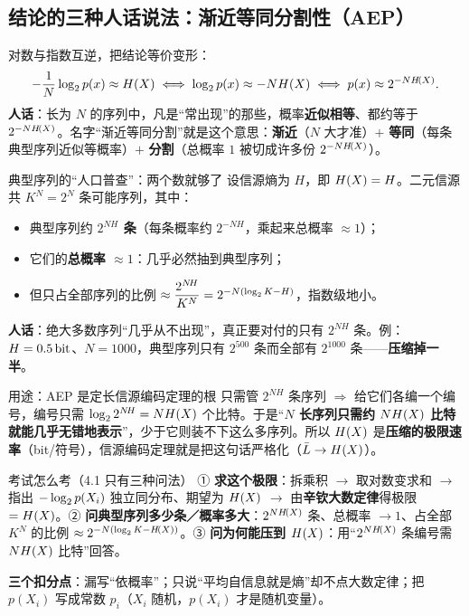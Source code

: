 \documentclass[11pt,a4paper]{ctexart}
\begin{document}
\subsection{结论的三种人话说法：渐近等同分割性（AEP）}

对数与指数互逆，把结论等价变形：
\begin{equation*}
-\frac1N\log_{2} p(x)\approx H\!\left(X\right)\iff \log_{2} p(x)\approx-NH\!\left(X\right)\iff p(x)\approx 2^{-NH\!\left(X\right)}.
\end{equation*}
\textbf{人话}：长为 $N$ 的序列中，凡是“常出现”的那些，概率\textbf{近似相等}、都约等于 $2^{-NH\!\left(X\right)}$。名字“渐近等同分割”就是这个意思：\textbf{渐近}（$N$ 大才准）$+$ \textbf{等同}（每条典型序列近似等概率）$+$ \textbf{分割}（总概率 $1$ 被切成许多份 $2^{-NH\!\left(X\right)}$）。

\begin{idea}{典型序列的“人口普查”：两个数就够了}
设信源熵为 $H$，即 $H\!\left(X\right)=H$。二元信源共 $K^N=2^N$ 条可能序列，其中：
\begin{itemize}[leftmargin=1.3em,itemsep=1pt,topsep=1pt]
  \item 典型序列约 \textbf{$2^{N\!H}$ 条}（每条概率约 $2^{-N\!H}$，乘起来总概率 $\approx1$）；
  \item 它们的\textbf{总概率 $\approx1$}：几乎必然抽到典型序列；
  \item 但只占全部序列的比例 $\approx \dfrac{2^{N\!H}}{K^N}=2^{-N(\log_{2} K-H)}$，指数级地小。
\end{itemize}
\textbf{人话}：绝大多数序列“几乎从不出现”，真正要对付的只有 $2^{N\!H}$ 条。例：$H=0.5\,\text{bit}$、$N=1000$，典型序列只有 $2^{500}$ 条而全部有 $2^{1000}$ 条——\textbf{压缩掉一半}。
\end{idea}

\begin{idea}{用途：AEP 是定长信源编码定理的根}
只需管 $2^{N\!H}$ 条序列 $\Rightarrow$ 给它们各编一个编号，编号只需 $\log_{2} 2^{N\!H}=NH\!\left(X\right)$ 个比特。于是“\textbf{$N$ 长序列只需约 $NH\!\left(X\right)$ 比特就能几乎无错地表示}”，少于它则装不下这么多序列。所以 $H\!\left(X\right)$ 是\textbf{压缩的极限速率}（bit/符号），信源编码定理就是把这句话严格化（$\bar L\to H\!\left(X\right)$）。
\end{idea}

\begin{exam}{考试怎么考（4.1 只有三种问法）}
① \textbf{求这个极限}：拆乘积 $\to$ 取对数变求和 $\to$ 指出 $-\log_{2} p(X_i)$ 独立同分布、期望为 $H\!\left(X\right)$ $\to$ 由\textbf{辛钦大数定律}得极限 $=H\!\left(X\right)$。② \textbf{问典型序列多少条／概率多大}：$2^{NH\!\left(X\right)}$ 条、总概率 $\to1$、占全部 $K^N$ 的比例 $\approx2^{-N(\log_{2} K-H\!\left(X\right))}$。③ \textbf{问为何能压到 $H\!\left(X\right)$}：用“$2^{NH\!\left(X\right)}$ 条编号需 $NH\!\left(X\right)$ 比特”回答。

\textbf{三个扣分点}：漏写“依概率”；只说“平均自信息就是熵”却不点大数定律；把 $p(X_i)$ 写成常数 $p_i$（$X_i$ 随机，$p(X_i)$ 才是随机变量）。
\end{exam}
\end{document}
